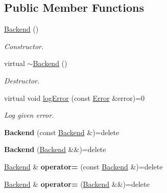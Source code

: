 \subsection*{Public Member Functions}
\begin{DoxyCompactItemize}
\item 
\hyperlink{class_mdt_1_1_error_logger_1_1_backend_acf0b4a7f061c638207bfdb172fc8015c}{Backend} ()
\begin{DoxyCompactList}\small\item\em Constructor. \end{DoxyCompactList}\item 
virtual \hyperlink{class_mdt_1_1_error_logger_1_1_backend_aba972e76fc4d6bb7665038cb8d1c88d7}{$\sim$\+Backend} ()
\begin{DoxyCompactList}\small\item\em Destructor. \end{DoxyCompactList}\item 
virtual void \hyperlink{class_mdt_1_1_error_logger_1_1_backend_acf37cfc576269934ca8ce04e3601058d}{log\+Error} (const \hyperlink{class_mdt_1_1_error}{Error} \&error)=0
\begin{DoxyCompactList}\small\item\em Log given error. \end{DoxyCompactList}\item 
{\bfseries Backend} (const \hyperlink{class_mdt_1_1_error_logger_1_1_backend}{Backend} \&)=delete\hypertarget{class_mdt_1_1_error_logger_1_1_backend_a7bb295be149f2205fe63554e1ba06f66}{}\label{class_mdt_1_1_error_logger_1_1_backend_a7bb295be149f2205fe63554e1ba06f66}

\item 
{\bfseries Backend} (\hyperlink{class_mdt_1_1_error_logger_1_1_backend}{Backend} \&\&)=delete\hypertarget{class_mdt_1_1_error_logger_1_1_backend_aba1ff6190a3b08ca93e8edd7917a7d25}{}\label{class_mdt_1_1_error_logger_1_1_backend_aba1ff6190a3b08ca93e8edd7917a7d25}

\item 
\hyperlink{class_mdt_1_1_error_logger_1_1_backend}{Backend} \& {\bfseries operator=} (const \hyperlink{class_mdt_1_1_error_logger_1_1_backend}{Backend} \&)=delete\hypertarget{class_mdt_1_1_error_logger_1_1_backend_a9400fcafaec1e9e07da2d31dcc842b92}{}\label{class_mdt_1_1_error_logger_1_1_backend_a9400fcafaec1e9e07da2d31dcc842b92}

\item 
\hyperlink{class_mdt_1_1_error_logger_1_1_backend}{Backend} \& {\bfseries operator=} (\hyperlink{class_mdt_1_1_error_logger_1_1_backend}{Backend} \&\&)=delete\hypertarget{class_mdt_1_1_error_logger_1_1_backend_ae0beab19d09a61f83eb5feed501a7562}{}\label{class_mdt_1_1_error_logger_1_1_backend_ae0beab19d09a61f83eb5feed501a7562}

\end{DoxyCompactItemize}
